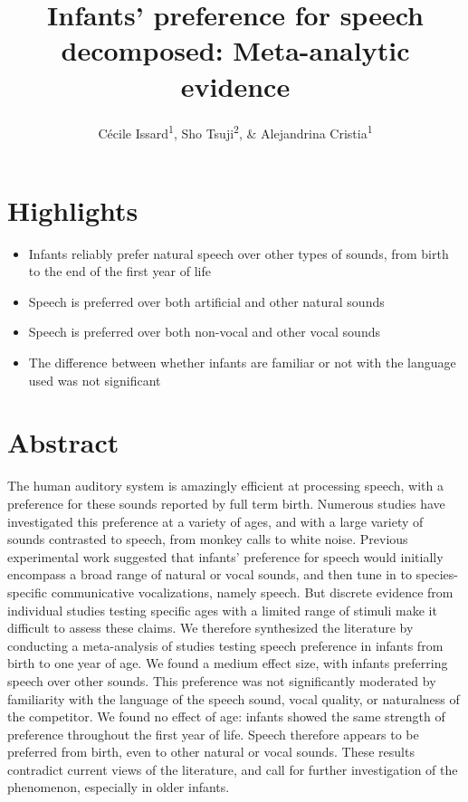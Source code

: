 \documentclass[man]{apa6}
\title{Infants' preference for speech decomposed: Meta-analytic evidence}
\author{Cécile Issard\textsuperscript{1}, Sho Tsuji\textsuperscript{2}, \&
Alejandrina Cristia\textsuperscript{1}}
\date{}
\affiliation{
\vspace{0.5cm}
\textsuperscript{1} Laboratoire de Sciences Cognitives et Psycholinguistique, Ecole Normale Supérieure, Département d'Études Cognitives\\\textsuperscript{2} International Research Center for Neurointelligence, The University of Tokyo}
\providecommand{\tightlist}{%
  \setlength{\itemsep}{0pt}\setlength{\parskip}{0pt}}
\begin{document}
\maketitle

\section{Highlights}\label{highlights}

\begin{itemize}
\tightlist
\item
  Infants reliably prefer natural speech over other types of sounds,
  from birth to the end of the first year of life
\item
  Speech is preferred over both artificial and other natural sounds
\item
  Speech is preferred over both non-vocal and other vocal sounds
\item
  The difference between whether infants are familiar or not with the
  language used was not significant
\end{itemize}

\section{Abstract}\label{abstract}

The human auditory system is amazingly efficient at processing speech,
with a preference for these sounds reported by full term birth. Numerous
studies have investigated this preference at a variety of ages, and with
a large variety of sounds contrasted to speech, from monkey calls to
white noise. Previous experimental work suggested that infants'
preference for speech would initially encompass a broad range of natural
or vocal sounds, and then tune in to species-specific communicative
vocalizations, namely speech. But discrete evidence from individual
studies testing specific ages with a limited range of stimuli make it
difficult to assess these claims. We therefore synthesized the
literature by conducting a meta-analysis of studies testing speech
preference in infants from birth to one year of age. We found a medium
effect size, with infants preferring speech over other sounds. This
preference was not significantly moderated by familiarity with the
language of the speech sound, vocal quality, or naturalness of the
competitor. We found no effect of age: infants showed the same strength
of preference throughout the first year of life. Speech therefore
appears to be preferred from birth, even to other natural or vocal
sounds. These results contradict current views of the literature, and
call for further investigation of the phenomenon, especially in older
infants.
\end{document}
